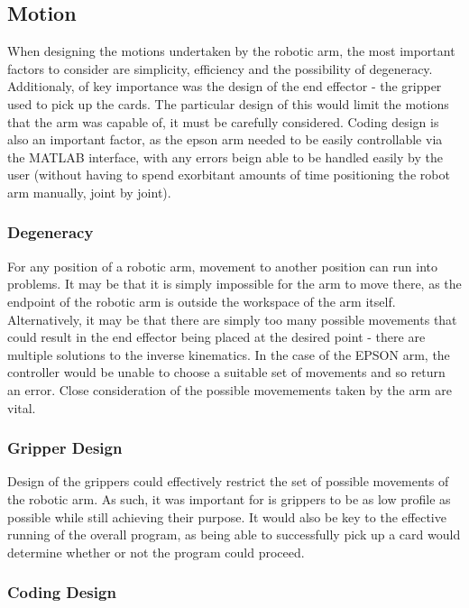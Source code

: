 \subsection{Motion}

When designing the motions undertaken by the robotic arm, the most important factors to consider are simplicity, efficiency and the possibility of degeneracy. Additionaly, of key importance was the design of the end effector - the gripper used to pick up the cards. The particular design of this would limit the motions that the arm was capable of, it must be carefully considered.
Coding design is also an important factor, as the epson arm needed to be easily controllable via the MATLAB interface, with any errors beign able to be handled easily by the user (without having to spend exorbitant amounts of time positioning the robot arm manually, joint by joint).


\subsubsection{Degeneracy}

For any position of a robotic arm, movement to another position can run into problems. It may be that it is simply impossible for the arm to move there, as the endpoint of the robotic arm is outside the workspace of the arm itself. Alternatively, it may be that there are simply too many possible movements that could result in the end effector being placed at the desired point - there are multiple solutions to the inverse kinematics. In the case of the EPSON arm, the controller would be unable to choose a suitable set of movements and so return an error. Close consideration of the possible movemements taken by the arm are vital.

\subsubsection{Gripper Design}

Design of the grippers could effectively restrict the set of possible movements of the robotic arm. As such, it was important for is grippers to be as low profile as possible while still achieving their purpose. It would also be key to the effective running of the overall program, as being able to successfully pick up a card would determine whether or not the program could proceed.

\subsubsection{Coding Design}


